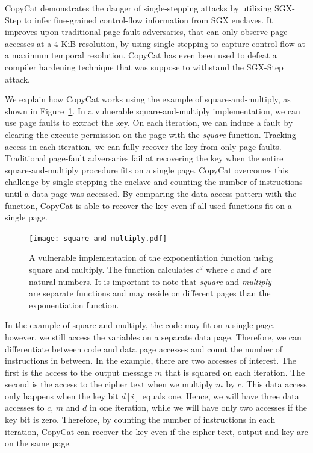 \documentclass{llncs}
\begin{document}
CopyCat \cite{MoghimiBHPS20} demonstrates the danger of single-stepping attacks
by utilizing SGX-Step to infer fine-grained control-flow information from SGX
enclaves.
It improves upon traditional page-fault adversaries, that can only observe page
accesses at a 4 KiB resolution, by using single-stepping to capture control
flow at a maximum temporal resolution.
CopyCat has even been used to defeat a compiler hardening technique
\cite{HosseinzadehLLP18} that was suppose to withstand the SGX-Step attack.

We explain how CopyCat works using the example of square-and-multiply,
as shown in Figure~\ref{fig:square-and-multiply}.
In a vulnerable square-and-multiply implementation, we can use page faults to
extract the key.
On each iteration, we can induce a fault by clearing the execute permission on
the page with the \emph{square} function.
Tracking access in each iteration, we can fully recover the key from only page
faults.
Traditional page-fault adversaries fail at recovering the key when the entire
square-and-multiply procedure fits on a single page.
CopyCat overcomes this challenge by single-stepping the enclave and counting
the number of instructions until a data page was accessed.
By comparing the data access pattern with the function, CopyCat is able to
recover the key even if all used functions fit on a single page.

\begin{figure}[t!]
  \centering
  \texttt{[image: square-and-multiply.pdf]}
  \caption{A vulnerable implementation of the exponentiation function using square and multiply.
    The function calculates $c^d$ where $c$ and $d$ are natural numbers.
    It is important to note that \emph{square} and \emph{multiply} are separate functions
    and may reside on different pages than the exponentiation function.}
  \label{fig:square-and-multiply}
\end{figure}

In the example of square-and-multiply, the code may fit on a single page,
however, we still access the variables on a separate data page.
Therefore, we can differentiate between code and data page accesses
and count the number of instructions in between.
In the example, there are two accesses of interest.
The first is the access to the output message $m$ that is squared on each
iteration.
The second is the access to the cipher text when we multiply $m$ by $c$.
This data access only happens when the key bit $d[i]$ equals one.
Hence, we will have three data accesses to $c$, $m$ and $d$ in one iteration,
while we will have only two accesses if the key bit is zero.
Therefore, by counting the number of instructions in each iteration,
CopyCat can recover the key even if the cipher text, output and key are on the
same page.
\end{document}
